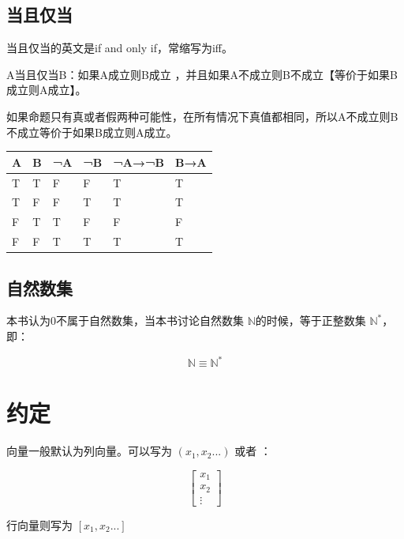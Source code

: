 \documentclass[12pt,oneside]{book}
\begin{document}
\section{当且仅当}
当且仅当的英文是if and only if，常缩写为iff。

A当且仅当B：如果A成立则B成立 ，并且如果A不成立则B不成立【等价于如果B成立则A成立】。

如果命题只有真或者假两种可能性，在所有情况下真值都相同，所以A不成立则B不成立等价于如果B成立则A成立。

\begin{table}[H]
\begin{tabular}{@{}llllll@{}}
\toprule
{A} & {B} & {¬A} & {¬B} & {¬A→¬B} & {B→A} \\ \midrule

{T}          & {T} & {F}  & {F}  & {T}     & {T}   \\
\rowcolor[HTML]{FFFFFF} 
{T}          & {F} & {F}  & {T}  & {T}     & {T}   \\
\rowcolor[HTML]{FFFFFF} 
{F}          & {T} & {T}  & {F}  & {F}     & {F}   \\
\rowcolor[HTML]{FFFFFF} 
{F}          & {F} & {T}  & {T}  & {T}     & {T}   \\ \bottomrule
\end{tabular}
\end{table}


\section{自然数集}
本书认为0不属于自然数集，当本书讨论自然数集 $ \mathbb{N} $的时候，等于正整数集 $\mathbb{N}^{*}$，即：

\[
\mathbb{N} \equiv \mathbb{N}^{*}
\]


\chapter{约定}
向量一般默认为列向量。可以写为 $(x_1, x_2...)$ 或者 ：

\[
\begin{bmatrix}x_{1}  \\ x_2 \\ \vdots \end{bmatrix}
\]

行向量则写为 $[x_1, x_2...]$






\backmatter
\end{document}
